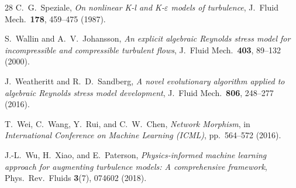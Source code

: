 \documentclass[preprint,aps,prb,longbibliography,superscriptaddress]{revtex4-2}
\begin{document}
\begin{thebibliography}{28}
  C.~G.~Speziale,
  \emph{On nonlinear K-l and K-$\varepsilon$ models of turbulence},
  J.\ Fluid Mech.\ \textbf{178}, 459--475 (1987).

  S.~Wallin and A.~V.~Johansson,
  \emph{An explicit algebraic Reynolds stress model for incompressible and compressible turbulent flows},
  J.\ Fluid Mech.\ \textbf{403}, 89--132 (2000).

  J.~Weatheritt and R.~D.~Sandberg,
  \emph{A novel evolutionary algorithm applied to algebraic Reynolds stress model development},
  J.\ Fluid Mech.\ \textbf{806}, 248--277 (2016).

  T.~Wei, C.~Wang, Y.~Rui, and C.~W.~Chen,
  \emph{Network Morphism},
  in \emph{International Conference on Machine Learning (ICML)},
  pp.~564--572 (2016).

  J.-L.~Wu, H.~Xiao, and E.~Paterson,
  \emph{Physics-informed machine learning approach for augmenting turbulence models: A comprehensive framework},
  Phys.\ Rev.\ Fluids \textbf{3}(7), 074602 (2018).

\end{thebibliography}
\end{document}
